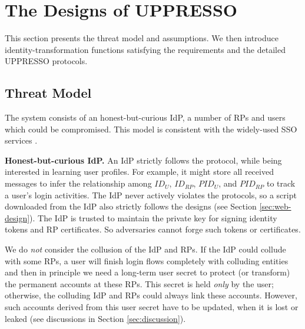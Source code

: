
\section{The Designs of UPPRESSO}
\label{sec:UPPRESSO}

This section presents the threat model and assumptions.
We then introduce identity-transformation functions satisfying the requirements
    and the detailed UPPRESSO protocols.


\subsection{Threat Model}
The system consists of an honest-but-curious IdP, a number of RPs and users which could be compromised. %
This model is consistent with the widely-used SSO services \cite{OpenIDConnect,rfc6749,SAML,SAMLIdentifier,NIST2017draft}.


\noindent \textbf{Honest-but-curious IdP.}
An IdP strictly follows the protocol, while being interested in learning user profiles.
For example, it might store all received messages
 to infer the relationship among $ID_U$, $ID_{RP}$, $PID_{U}$, and $PID_{RP}$ to track a user's login activities.
The IdP never actively violates the protocols,
so a script downloaded from the IdP also strictly follows the designs (see Section \ref{sec:web-design}).
The IdP is trusted to maintain the private key for signing identity tokens and RP certificates. %
So adversaries cannot forge such tokens or certificates.

We do \emph{not} consider the collusion of the IdP and RPs.
    If the IdP could collude with some RPs,
        a user will finish login flows completely with colluding entities
        and then in principle we need a long-term user secret to protect (or transform) the permanent accounts at these RPs.
This secret is held \emph{only} by the user;
    otherwise, the colluding IdP and RPs could always link these accounts.
However, such accounts derived from this user secret have to be updated,
    when it is lost or leaked
    (see discussions in Section \ref{sec:discussion}).

